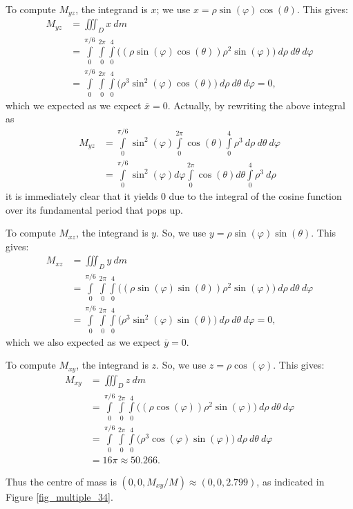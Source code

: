 \begin{example}
To compute $M_{yz}$, the integrand is $x$; we use $x = \rho\sin(\varphi)\cos(\theta)$. This gives:
\begin{align*}
M_{yz} &= \iiint_D x\ dm \\
	&= \int\limits_0^{\pi/6}\int\limits_0^{2\pi}\int\limits_0^4 \big((\rho\sin(\varphi)\cos(\theta))\rho^2\sin(\varphi)\big) \ d\rho\ d\theta\ d\varphi\\[0.2cm]
	&= \int\limits_0^{\pi/6}\int\limits_0^{2\pi}\int\limits_0^4 \big(\rho^3\sin^2(\varphi)\cos(\theta)\big) \ d\rho\ d\theta\ d\varphi=0,
\end{align*}
which we expected as we expect $\overline{x} = 0$. Actually, by rewriting the above integral as
\begin{align*}
M_{yz}&= \int\limits_0^{\pi/6}\sin^2(\varphi)\int\limits_0^{2\pi}\cos(\theta)\int\limits_0^4\rho^3 \ d\rho\ d\theta\ d\varphi\\[0.2cm]
&= \int\limits_0^{\pi/6}\sin^2(\varphi) d\varphi\int\limits_0^{2\pi}\cos(\theta)d\theta\int\limits_0^4\rho^3 \ d\rho
\end{align*}
it is immediately clear that it yields $0$ due to the integral of the cosine function over its fundamental period that pops up.

To compute $M_{xz}$, the integrand is $y$. So, we use $y = \rho\sin(\varphi)\sin(\theta)$. This gives:
\begin{align*}
M_{xz} &= \iiint_D y\ dm \\
	&= \int\limits_0^{\pi/6}\int\limits_0^{2\pi}\int\limits_0^4 \big((\rho\sin(\varphi)\sin(\theta))\rho^2\sin(\varphi)\big) \ d\rho\ d\theta\ d\varphi\\[0.2cm]
	&= \int\limits_0^{\pi/6}\int\limits_0^{2\pi}\int\limits_0^4 \big(\rho^3\sin^2(\varphi)\sin(\theta)\big) \ d\rho\ d\theta\ d\varphi =0,
\end{align*}
which we also expected as we expect $\overline{y} = 0$.

To compute $M_{xy}$, the integrand is $z$. So, we use $z = \rho\cos(\varphi)$. This gives:
\begin{align*}
M_{xy} &= \iiint_D z\ dm \\
	&= \int\limits_0^{\pi/6}\int\limits_0^{2\pi}\int\limits_0^4 \big((\rho\cos(\varphi))\rho^2\sin(\varphi)\big) \ d\rho\ d\theta\ d\varphi\\[0.2cm]
	&= \int\limits_0^{\pi/6}\int\limits_0^{2\pi}\int\limits_0^4 \big(\rho^3\cos(\varphi)\sin(\varphi)\big) \ d\rho\ d\theta\ d\varphi\\[0.2cm]
	&=16\pi \approx 50.266.
\end{align*}

Thus the centre of mass is $(0,0,M_{xy}/M) \approx (0,0,2.799)$, as indicated in Figure \ref{fig_multiple_34}. 
\end{example}


